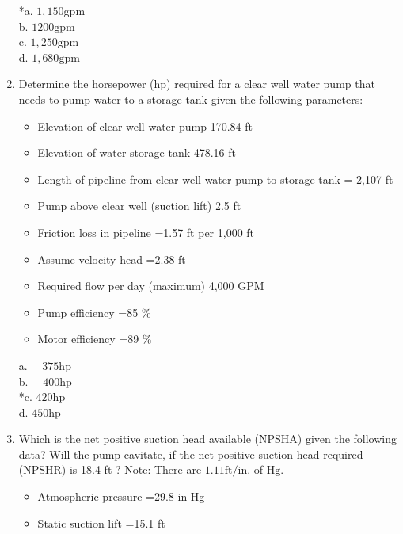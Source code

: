 \begin{enumerate}
*a. $1,150 \mathrm{gpm}$\\
b. $1200 \mathrm{gpm}$\\
c. $1,250 \mathrm{gpm}$\\
d. $1,680 \mathrm{gpm}$\\
\item Determine the horsepower (hp) required for a clear well water pump that needs to pump water to a storage tank given the following parameters:\\
\begin{itemize}
\item Elevation of clear well water pump 170.84 ft\\
\item Elevation of water storage tank 478.16 ft\\
\item Length of pipeline from clear well water pump to storage tank = 2,107 ft\\
\item Pump above clear well (suction lift) 2.5 ft\\
\item Friction loss in pipeline =1.57 ft per 1,000 ft\\
\item Assume velocity head =2.38 ft\\
\item Required flow per day (maximum) 4,000 GPM\\
\item Pump efficiency =85 \%\\
\item Motor efficiency =89 \%\\
\end{itemize}
a. $\quad 375 \mathrm{hp}$\\
b. $\quad 400 \mathrm{hp}$\\
*c. $420 \mathrm{hp}$\\
d. $450 \mathrm{hp}$ \\
\item Which is the net positive suction head available (NPSHA) given the following data? Will the pump cavitate, if the net positive suction head required (NPSHR) is 18.4 ft ? Note: There are $1.11 \mathrm{ft} / \mathrm{in}$. of $\mathrm{Hg}$.\\
\begin{itemize}
\item Atmospheric pressure =29.8 in Hg\\
\item Static suction lift =15.1 ft\\

\end{itemize}
\end{enumerate}
